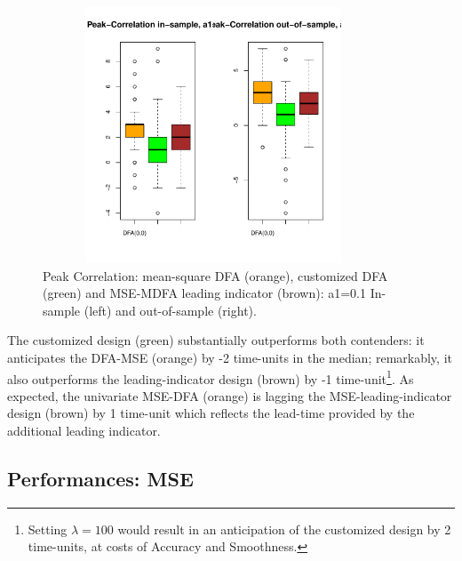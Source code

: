 \documentclass[a4paper]{book}
\begin{document}
\begin{figure}[H]\begin{center}\includegraphics[height=3in, width=4in]{z_peak_cor_dfacust_leadind}\caption{Peak Correlation: mean-square DFA (orange), customized DFA (green) and MSE-MDFA leading indicator (brown): a1=0.1 In-sample (left) and out-of-sample (right).\label{z_peak_cor_dfacust_leadind}}\end{center}\end{figure}The customized design (green) substantially outperforms both contenders: it anticipates the DFA-MSE (orange) by -2 time-units in the median; remarkably, it also outperforms the leading-indicator design (brown) by -1 time-unit\footnote{Setting $\lambda=100$ would result in an anticipation of the customized design by 2 time-units, at costs of Accuracy and Smoothness.}. As expected, the univariate MSE-DFA (orange) is lagging the MSE-leading-indicator design (brown) by 1 time-unit which reflects the lead-time provided by  the additional leading indicator.




\subsection{Performances: MSE}
\end{document}
